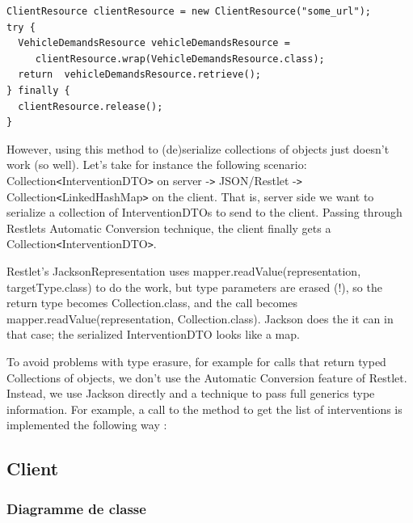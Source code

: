 \documentclass{article}
\begin{document}
\begin{lstlisting}
ClientResource clientResource = new ClientResource("some_url");
try {
  VehicleDemandsResource vehicleDemandsResource = 
     clientResource.wrap(VehicleDemandsResource.class);
  return  vehicleDemandsResource.retrieve();
} finally {
  clientResource.release();
}
\end{lstlisting}

However, using this method to (de)serialize collections of objects 
just doesn't work (so well). Let's take for instance the following scenario: Collection\texttt{<}InterventionDTO\texttt{>} 
on server -\texttt{>} JSON/Restlet -\texttt{>} Collection\texttt{<}LinkedHashMap\texttt{>} 
on the client. That is, server side we want to serialize a collection of InterventionDTOs 
to send to the client. Passing through Restlets Automatic Conversion technique, 
the client finally gets a Collection\texttt{<}InterventionDTO\texttt{>}.

Restlet's JacksonRepresentation uses mapper.readValue(representation, 
targetType.class) to do the work, but type parameters are erased (!), so the return 
type becomes Collection.class, and the call becomes mapper.readValue(representation, 
Collection.class). Jackson does the it can in that case; the serialized InterventionDTO 
looks like a map.

To avoid problems with type erasure, for example for calls that 
return typed Collections of objects, we don't use the Automatic Conversion feature 
of Restlet. Instead, we use Jackson directly and a technique to pass full generics 
type information. For example, a call to the method to get the list of interventions 
is implemented the following way :


\subsection{Client}

\subsubsection{Diagramme de classe}
\end{document}
